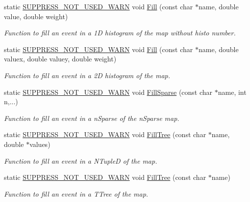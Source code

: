\begin{DoxyCompactItemize}
static \hyperlink{HistClass_8hh_a85edd6ac47f5ea2970c76af20855738c}{S\-U\-P\-P\-R\-E\-S\-S\-\_\-\-N\-O\-T\-\_\-\-U\-S\-E\-D\-\_\-\-W\-A\-R\-N} void \hyperlink{namespaceHistClass_a4f910295af0ec93ce3c0b95c4229cf7e}{Fill} (const char $\ast$name, double value, double weight)
\begin{DoxyCompactList}\small\item\em Function to fill an event in a 1\-D histogram of the map without histo number. \end{DoxyCompactList}\item 
static \hyperlink{HistClass_8hh_a85edd6ac47f5ea2970c76af20855738c}{S\-U\-P\-P\-R\-E\-S\-S\-\_\-\-N\-O\-T\-\_\-\-U\-S\-E\-D\-\_\-\-W\-A\-R\-N} void \hyperlink{namespaceHistClass_a6449381ae1c63abbdff99922f211e4da}{Fill} (const char $\ast$name, double valuex, double valuey, double weight)
\begin{DoxyCompactList}\small\item\em Function to fill an event in a 2\-D histogram of the map. \end{DoxyCompactList}\item 
static \hyperlink{HistClass_8hh_a85edd6ac47f5ea2970c76af20855738c}{S\-U\-P\-P\-R\-E\-S\-S\-\_\-\-N\-O\-T\-\_\-\-U\-S\-E\-D\-\_\-\-W\-A\-R\-N} void \hyperlink{namespaceHistClass_af9874c2196170b31d16f867dd82259de}{Fill\-Sparse} (const char $\ast$name, int n,...)
\begin{DoxyCompactList}\small\item\em Function to fill an event in a n\-Sparse of the n\-Sparse map. \end{DoxyCompactList}\item 
static \hyperlink{HistClass_8hh_a85edd6ac47f5ea2970c76af20855738c}{S\-U\-P\-P\-R\-E\-S\-S\-\_\-\-N\-O\-T\-\_\-\-U\-S\-E\-D\-\_\-\-W\-A\-R\-N} void \hyperlink{namespaceHistClass_a8956f590d0bf5e1b2ed5e9dda454b46a}{Fill\-Tree} (const char $\ast$name, double $\ast$values)
\begin{DoxyCompactList}\small\item\em Function to fill an event in a N\-Tuple\-D of the map. \end{DoxyCompactList}\item 
static \hyperlink{HistClass_8hh_a85edd6ac47f5ea2970c76af20855738c}{S\-U\-P\-P\-R\-E\-S\-S\-\_\-\-N\-O\-T\-\_\-\-U\-S\-E\-D\-\_\-\-W\-A\-R\-N} void \hyperlink{namespaceHistClass_ab5bdb8590d6f7406c36ec2d02006ef4b}{Fill\-Tree} (const char $\ast$name)
\begin{DoxyCompactList}\small\item\em Function to fill an event in a T\-Tree of the map. \end{DoxyCompactList}\item 

\end{DoxyCompactItemize}
